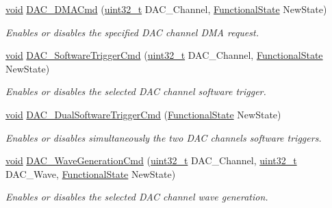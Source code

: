 \begin{DoxyCompactItemize}
\hyperlink{usb__devapi_8h_afabf60e7f57651d6d595a02c75f07cd0}{void} \hyperlink{group___d_a_c___private___functions_ga194cba38f60ace11658824f0250121f4}{D\+A\+C\+\_\+\+D\+M\+A\+Cmd} (\hyperlink{_p_e___types_8h_a33594304e786b158f3fb30289278f5af}{uint32\+\_\+t} D\+A\+C\+\_\+\+Channel, \hyperlink{agilefox_2library_2inc_2stm32f10x__type_8h_ac9a7e9a35d2513ec15c3b537aaa4fba1}{Functional\+State} New\+State)
\begin{DoxyCompactList}\small\item\em Enables or disables the specified D\+AC channel D\+MA request. \end{DoxyCompactList}\item 
\hyperlink{usb__devapi_8h_afabf60e7f57651d6d595a02c75f07cd0}{void} \hyperlink{group___d_a_c___private___functions_ga46f9f7f6b9520a86e300fe966afe5fb3}{D\+A\+C\+\_\+\+Software\+Trigger\+Cmd} (\hyperlink{_p_e___types_8h_a33594304e786b158f3fb30289278f5af}{uint32\+\_\+t} D\+A\+C\+\_\+\+Channel, \hyperlink{agilefox_2library_2inc_2stm32f10x__type_8h_ac9a7e9a35d2513ec15c3b537aaa4fba1}{Functional\+State} New\+State)
\begin{DoxyCompactList}\small\item\em Enables or disables the selected D\+AC channel software trigger. \end{DoxyCompactList}\item 
\hyperlink{usb__devapi_8h_afabf60e7f57651d6d595a02c75f07cd0}{void} \hyperlink{group___d_a_c___private___functions_gab4d3b364a6b184dcd65f3b294ebf56dc}{D\+A\+C\+\_\+\+Dual\+Software\+Trigger\+Cmd} (\hyperlink{agilefox_2library_2inc_2stm32f10x__type_8h_ac9a7e9a35d2513ec15c3b537aaa4fba1}{Functional\+State} New\+State)
\begin{DoxyCompactList}\small\item\em Enables or disables simultaneously the two D\+AC channels software triggers. \end{DoxyCompactList}\item 
\hyperlink{usb__devapi_8h_afabf60e7f57651d6d595a02c75f07cd0}{void} \hyperlink{group___d_a_c___private___functions_gabd51ae6880821d4dcd923969ec19a19e}{D\+A\+C\+\_\+\+Wave\+Generation\+Cmd} (\hyperlink{_p_e___types_8h_a33594304e786b158f3fb30289278f5af}{uint32\+\_\+t} D\+A\+C\+\_\+\+Channel, \hyperlink{_p_e___types_8h_a33594304e786b158f3fb30289278f5af}{uint32\+\_\+t} D\+A\+C\+\_\+\+Wave, \hyperlink{agilefox_2library_2inc_2stm32f10x__type_8h_ac9a7e9a35d2513ec15c3b537aaa4fba1}{Functional\+State} New\+State)
\begin{DoxyCompactList}\small\item\em Enables or disables the selected D\+AC channel wave generation. \end{DoxyCompactList}\item 

\end{DoxyCompactItemize}
